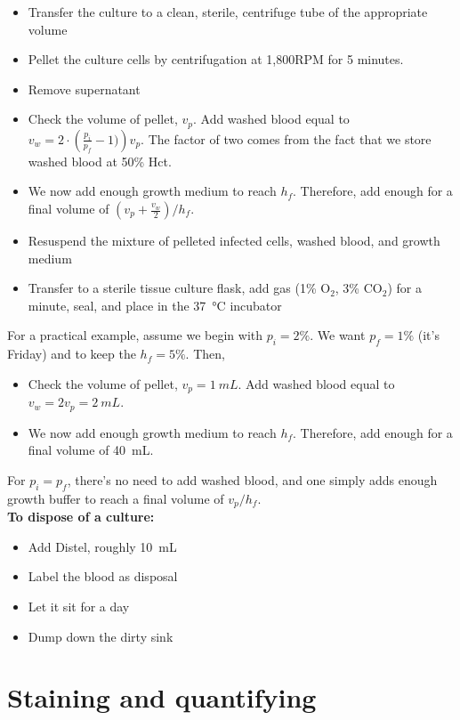 \documentclass{article}
\begin{document}
\begin{itemize}
	\item Transfer the culture to a clean, sterile, centrifuge tube of the appropriate volume
	\item Pellet the culture cells by centrifugation at 1,800RPM for 5 minutes.
	\item Remove supernatant
	\item Check the volume of pellet, $v_p$. Add washed blood equal to $v_w = 2 \cdot \left( \tfrac{p_i}{p_f} - 1) \right) v_p$. The factor of two comes from the fact that we store washed blood at 50\% Hct.
	\item We now add enough growth medium to reach $h_f$. Therefore, add enough for a final volume of $(v_p + \tfrac{v_w}{2})/h_f$.
	\item Resuspend the mixture of pelleted infected cells, washed blood, and growth medium
	\item Transfer to a sterile tissue culture flask, add gas (1\% O$_2$, 3\% CO$_2$) for a minute, seal, and place in the \SI{37}{\celsius} incubator
\end{itemize}

For a practical example, assume we begin with $p_i = 2\%$. We want $p_f = 1\%$ (it's Friday) and to keep the $h_f = 5\%$. Then,

\begin{itemize}
	\item Check the volume of pellet, $v_p = \SI{1}{mL}$. Add washed blood equal to $v_w = 2 v_p = \SI{2}{mL}$. 
	\item We now add enough growth medium to reach $h_f$. Therefore, add enough for a final volume of \SI{40}{mL}.
\end{itemize}

For $p_i = p_f$, there's no need to add washed blood, and one simply adds enough growth buffer to reach a final volume of $v_p/h_f$.\\

\textbf{To dispose of a culture:}

\begin{itemize}
	\item Add Distel, roughly \SI{10}{mL}
	\item Label the blood as disposal
	\item Let it sit for a day
	\item Dump down the dirty sink
\end{itemize}

\newpage
\section{Staining and quantifying}
\end{document}
